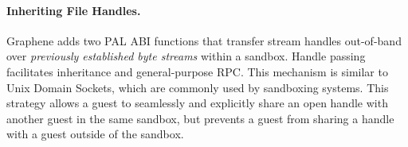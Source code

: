\paragraph{Inheriting File Handles.}
Graphene adds two PAL ABI functions that transfer 
stream handles out-of-band over {\em previously 
established byte streams} within a sandbox.  Handle passing facilitates inheritance
and general-purpose RPC.
This mechanism is similar to Unix Domain Sockets,
which are commonly used by sandboxing systems. %
This strategy allows a guest to seamlessly and explicitly 
share an open handle with another guest in the same sandbox, but prevents
a guest from sharing a handle with a guest outside of the sandbox.

\begin{comment}
\vspace{5pt}
\noindent{\bf Discussion.~}
A Graphene picoprocess can copy part or all its address space into a child
picoprocess relatively efficiently.
Although this mechanism is less efficient than an in-kernel {\tt fork},
we wanted to maintain the generality benefits of recent libOSes, 
and only added the minimal building blocks to the host ABI.
The transfer of data is explicit to the host, can be mediated by a reference monitor,
the sender, or the receiver.
For instance, recent Unix systems introduced a close-on-exec flag for file handles~\citep{close-on-exec}, 
which prevents inheritance of handles to sensitive files.  This can be implemented
either in a parent, by excluding the file handle from a checkpoint, 
or in the child, by closing this handle on an {\tt exec} call.
Our current implementation implements close-on-exec in the child for complete compatibility,
but a more security-sensitive application could easily implement ``close-on-fork'' semantics 
in the parent.
This clean division of labor retains full functionality
and facilitates extensibility.


\end{comment}
